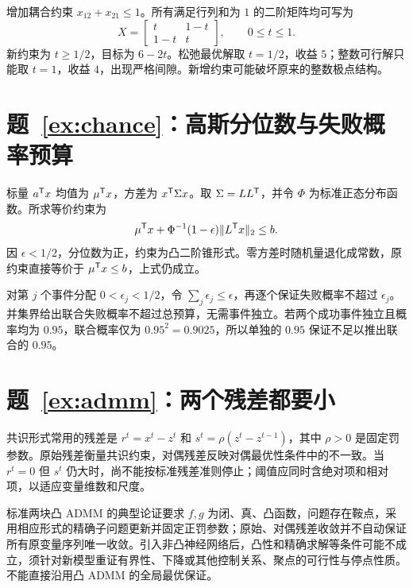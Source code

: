 增加耦合约束 $x_{12}+x_{21}\leq1$。所有满足行列和为 $1$ 的二阶矩阵均可写为
\[
 X=\begin{bmatrix}t&1-t\\1-t&t\end{bmatrix},\qquad 0\leq t\leq1.
\]
新约束为 $t\geq1/2$，目标为 $6-2t$。松弛最优解取 $t=1/2$，收益 $5$；整数可行解只能取 $t=1$，收益 $4$，出现严格间隙。新增约束可能破坏原来的整数极点结构。

\section*{题~\ref{ex:chance}：高斯分位数与失败概率预算}
标量 $a^{\mathsf T}x$ 均值为 $\mu^{\mathsf T}x$，方差为 $x^{\mathsf T}\Sigma x$。取 $\Sigma=LL^{\mathsf T}$，并令 $\Phi$ 为标准正态分布函数。所求等价约束为
\[
 \mu^{\mathsf T}x+\Phi^{-1}(1-\epsilon)\|L^{\mathsf T}x\|_2\leq b.
\]
因 $\epsilon<1/2$，分位数为正，约束为凸二阶锥形式。零方差时随机量退化成常数，原约束直接等价于 $\mu^{\mathsf T}x\leq b$，上式仍成立。

对第 $j$ 个事件分配 $0<\epsilon_j<1/2$，令 $\sum_j\epsilon_j\leq\epsilon$，再逐个保证失败概率不超过 $\epsilon_j$。并集界给出联合失败概率不超过总预算，无需事件独立。若两个成功事件独立且概率均为 $0.95$，联合概率仅为 $0.95^2=0.9025$，所以单独的 $0.95$ 保证不足以推出联合的 $0.95$。

\section*{题~\ref{ex:admm}：两个残差都要小}
共识形式常用的残差是 $r^t=x^t-z^t$ 和 $s^t=\rho(z^t-z^{t-1})$，其中 $\rho>0$ 是固定罚参数。原始残差衡量共识约束，对偶残差反映对偶最优性条件中的不一致。当 $r^t=0$ 但 $s^t$ 仍大时，尚不能按标准残差准则停止；阈值应同时含绝对项和相对项，以适应变量维数和尺度。

标准两块凸 ADMM 的典型论证要求 $f,g$ 为闭、真、凸函数，问题存在鞍点，采用相应形式的精确子问题更新并固定正罚参数；原始、对偶残差收敛并不自动保证所有原变量序列唯一收敛。引入非凸神经网络后，凸性和精确求解等条件可能不成立，须针对新模型重证有界性、下降或其他控制关系、聚点的可行性与停点性质。不能直接沿用凸 ADMM 的全局最优保证。
